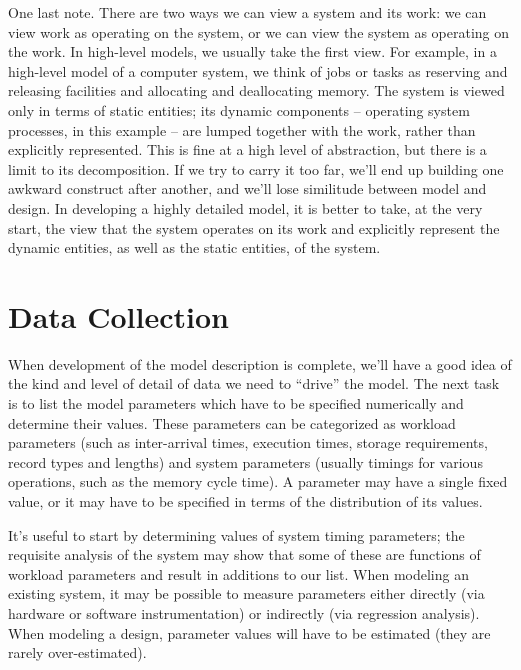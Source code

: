 One last note. There are two ways we can view a system and its work: we can
view work as operating on the system, or we can view the system as operating
on the work. In high-level models, we usually take the first view. For
example, in a high-level model of a computer system, we think of jobs or tasks
as reserving and releasing facilities and allocating and deallocating memory.
The system is viewed only in terms of static entities; its dynamic components
-- operating system processes, in this example -- are lumped together with the
work, rather than explicitly represented. This is fine at a high level of
abstraction, but there is a limit to its decomposition. If we try to carry it
too far, we'll end up building one awkward construct after another, and we'll
lose similitude between model and design. In developing a highly detailed
model, it is better to take, at the very start, the view that the system
operates on its work and explicitly represent the dynamic entities, as well as
 the static entities, of the system.

\section{Data Collection}
\label{sec:data-collection}

When development of the model description is complete, we'll have a good idea
of the kind and level of detail of data we need to ``drive'' the model. The
next task is to list the model parameters which have to be specified
numerically and determine their values. These parameters can be categorized
as workload parameters (such as inter-arrival times, execution times, storage
requirements, record types and lengths) and system parameters (usually timings
for various operations, such as the memory cycle time). A parameter may have
a single fixed value, or it may have to be specified in terms of the
 distribution of its values.

It's useful to start by determining values of system timing parameters; the
requisite analysis of the system may show that some of these are functions of
workload parameters and result in additions to our list. When modeling an
existing system, it may be possible to measure parameters either directly
(via hardware or software instrumentation) or indirectly (via regression
analysis). When modeling a design, parameter values will have to be estimated
(they are rarely over-estimated).

